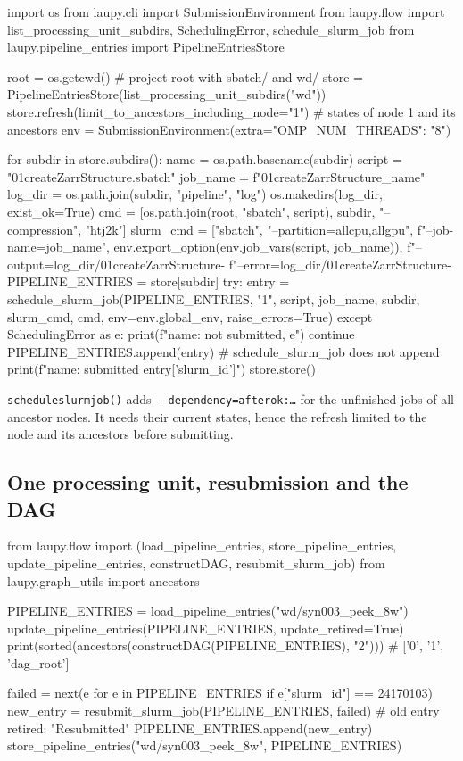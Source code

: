 \documentclass[11pt,a4paper]{article}
\DeclareRobustCommand{\_}{\textunderscore\allowbreak}
\newcommand{\cmd}[1]{\texttt{#1}}
\begin{document}
\begin{code}
import os
from laupy.cli import SubmissionEnvironment
from laupy.flow import list_processing_unit_subdirs, SchedulingError, schedule_slurm_job
from laupy.pipeline_entries import PipelineEntriesStore

root = os.getcwd()                                   # project root with sbatch/ and wd/
store = PipelineEntriesStore(list_processing_unit_subdirs("wd"))
store.refresh(limit_to_ancestors_including_node="1") # states of node 1 and its ancestors
env = SubmissionEnvironment(extra={"OMP_NUM_THREADS": "8"})

for subdir in store.subdirs():
    name = os.path.basename(subdir)
    script = "01createZarrStructure.sbatch"
    job_name = f"01createZarrStructure_{name}"
    log_dir = os.path.join(subdir, "pipeline", "log")
    os.makedirs(log_dir, exist_ok=True)
    cmd = [os.path.join(root, "sbatch", script), subdir, "--compression", "htj2k"]
    slurm_cmd = ["sbatch", "--partition=allcpu,allgpu", f"--job-name={job_name}",
                 env.export_option(env.job_vars(script, job_name)),
                 f"--output={log_dir}/01createZarrStructure-%
                 f"--error={log_dir}/01createZarrStructure-%
    PIPELINE_ENTRIES = store[subdir]
    try:
        entry = schedule_slurm_job(PIPELINE_ENTRIES, "1", script, job_name, subdir,
                                   slurm_cmd, cmd, env=env.global_env, raise_errors=True)
    except SchedulingError as e:
        print(f"{name}: not submitted, {e}")
        continue
    PIPELINE_ENTRIES.append(entry)          # schedule_slurm_job does not append
    print(f"{name}: submitted {entry['slurm_id']}")
store.store()
\end{code}

\cmd{schedule\_slurm\_job()} adds \cmd{-{}-dependency=afterok:\ldots} for the unfinished jobs of
all ancestor nodes. It needs their current states, hence the refresh limited to the node and its
ancestors before submitting.

\subsection{One processing unit, resubmission and the DAG}

\begin{code}
from laupy.flow import (load_pipeline_entries, store_pipeline_entries, update_pipeline_entries,
                        constructDAG, resubmit_slurm_job)
from laupy.graph_utils import ancestors

PIPELINE_ENTRIES = load_pipeline_entries("wd/syn003_peek_8w")
update_pipeline_entries(PIPELINE_ENTRIES, update_retired=True)
print(sorted(ancestors(constructDAG(PIPELINE_ENTRIES), "2")))   # ['0', '1', 'dag_root']

failed = next(e for e in PIPELINE_ENTRIES if e["slurm_id"] == 24170103)
new_entry = resubmit_slurm_job(PIPELINE_ENTRIES, failed)          # old entry retired: "Resubmitted"
PIPELINE_ENTRIES.append(new_entry)
store_pipeline_entries("wd/syn003_peek_8w", PIPELINE_ENTRIES)
\end{code}
\end{document}
